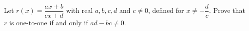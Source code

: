Let $r(x)=\dfrac{ax+b}{cx+d}$ with real $a,b,c,d$ and $c\ne0$, defined for $x\ne-\dfrac dc$. Prove that $r$ is one-to-one if and only if $ad-bc\ne0$.
